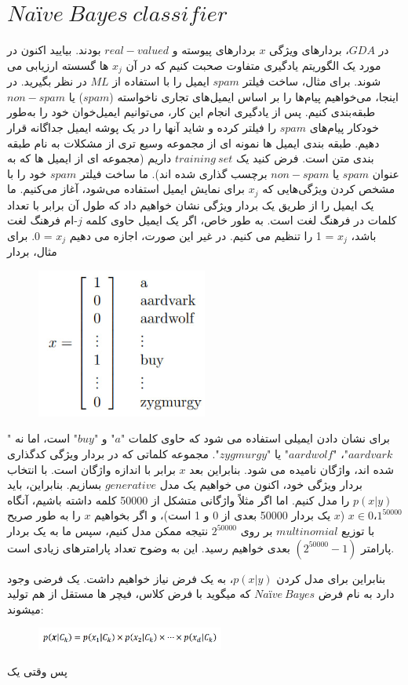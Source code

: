 \documentclass[12pt]{article}
\begin{document}
\section*{$Naïve\:Bayes\:classifier$}
در $GDA$، بردارهای ویژگی $x$ بردارهای پیوسته و $real-valued$ بودند. بیایید اکنون در مورد یک الگوریتم یادگیری متفاوت صحبت کنیم که در آن $x_j$ ها گسسته ارزیابی می شوند.
برای مثال، ساخت فیلتر $spam$ ایمیل را با استفاده از $ML$ در نظر بگیرید. در اینجا، می‌خواهیم پیام‌ها را بر اساس ایمیل‌های تجاری ناخواسته ($spam$) یا $non-spam$ طبقه‌بندی کنیم. پس از یادگیری انجام این کار، می‌توانیم ایمیل‌خوان خود را به‌طور خودکار پیام‌های $spam$ را فیلتر کرده و شاید آنها را در یک پوشه ایمیل جداگانه قرار دهیم. طبقه بندی ایمیل ها نمونه ای از مجموعه وسیع تری از مشکلات به نام طبقه بندی متن است.
فرض کنید یک $ training\:set$ داریم (مجموعه ای از ایمیل ها که به عنوان $spam$ یا $non-spam$ برچسب گذاری شده اند). ما ساخت فیلتر $spam$ خود را با مشخص کردن ویژگی‌هایی که $x_j$ برای نمایش ایمیل استفاده می‌شود، آغاز می‌کنیم.
ما یک ایمیل را از طریق یک بردار ویژگی نشان خواهیم داد که طول آن برابر با تعداد کلمات در فرهنگ لغت است. به طور خاص، اگر یک ایمیل حاوی کلمه $j$-ام فرهنگ لغت باشد، $x_j$ = 1 را تنظیم می کنیم. در غیر این صورت، اجازه می دهیم $x_j$ = 0. برای مثال، بردار
\begin{figure}[h]
  \centering
  \includegraphics[width=0.5\textwidth]{figs/7.png}
  \label{7}
\end{figure}
برای نشان دادن ایمیلی استفاده می شود که حاوی کلمات "$a$" و "$buy$" است، اما نه "$aardvark$"، "$aardwolf$" یا "$zygmurgy$". مجموعه کلماتی که در بردار ویژگی کدگذاری شده اند، واژگان نامیده می شود. بنابراین بعد $x$ برابر با اندازه واژگان است.
با انتخاب بردار ویژگی خود، اکنون می خواهیم یک مدل $generative$ بسازیم. بنابراین، باید $p(x|y)$ را مدل کنیم. اما اگر مثلاً واژگانی متشکل از 50000 کلمه داشته باشیم، آنگاه
 $x ∈ {0، 1}^50000$ ($x$ یک بردار 50000 بعدی از 0 و 1 است)، و اگر بخواهیم $x$ را به طور صریح با توزیع $multinomial$ بر روی $2^50000$ نتیجه ممکن مدل کنیم، سپس ما به یک بردار پارامتر $(2^50000-1)$ بعدی خواهیم رسید. این به وضوح تعداد پارامترهای زیادی است.
 
 بنابراین برای مدل کردن $p(x|y)$، به یک فرض نیاز خواهیم داشت.
یک فرضی وجود دارد به نام فرض $Naïve\:Bayes$ که میگوید با فرض کلاس، فیچر ها مستقل از هم تولید میشوند:
\begin{figure}[h]
  \centering
  \includegraphics[width=0.55\textwidth]{figs/6.png}
  \label{6}
\end{figure}

پس وقتی یک
\end{document}
